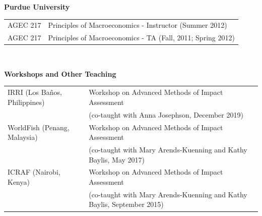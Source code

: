 \documentclass[letterpaper]{article}
\renewenvironment{itemize}{
  \begin{list}
  	{}{
    \setlength{\leftmargin}{1.5em}
    \setlength{\itemsep}{-.5em}
  }
}{
  \end{list}
}
\begin{document}
\begin{itemize}
	\item {\bf Purdue University} \\
	\begin{tabular}{ll}
		AGEC 217	& Principles of Macroeconomics - Instructor (Summer 2012) \\
		AGEC 217	& Principles of Macroeconomics - TA (Fall, 2011; Spring 2012) \\
	\end{tabular}
	\\

	\leftskip 0in
	\item {\bf Workshops and Other Teaching} \\
	\begin{tabular}{lp{\linewidth}}
		IRRI (Los Ba\~{n}os, Philippines) & Workshop on Advanced Methods of Impact Assessment \\
		& (co-taught with Anna Josephson, December 2019)  \\
  		WorldFish (Penang, Malaysia) & Workshop on Advanced Methods of Impact Assessment \\
  		& (co-taught with Mary Arends-Kuenning and Kathy Baylis, May 2017) \\
		ICRAF (Nairobi, Kenya) & Workshop on Advanced Methods of Impact Assessment \\
		& (co-taught with  Mary Arends-Kuenning and Kathy Baylis, September 2015)  \\
	\end{tabular} \\


\end{itemize}
\end{document}
